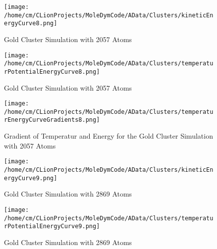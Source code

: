 \begin{figure}[!h] 
    \begin{center} 
        \texttt{[image: /home/cm/CLionProjects/MoleDymCode/AData/Clusters/kineticEnergyCurve8.png]} 
    \end{center} 
    \caption[Gold Cluster Simulation with 2057 Atoms]{Gold Cluster Simulation with 2057 Atoms} 
    \label{GoldClusterSimulationKineticTime2057} 
\end{figure} 
 
\begin{figure}[!h] 
    \begin{center} 
        \texttt{[image: /home/cm/CLionProjects/MoleDymCode/AData/Clusters/temperaturPotentialEnergyCurve8.png]} 
    \end{center} 
    \caption[Gold Cluster Simulation with 2057 Atoms]{Gold Cluster Simulation with 2057 Atoms} 
    \label{GoldClusterSimulationTemperaturEnergy2057} 
\end{figure} 
 
\begin{figure}[!h] 
    \begin{center} 
        \texttt{[image: /home/cm/CLionProjects/MoleDymCode/AData/Clusters/temperaturEnergyCurveGradients8.png]} 
    \end{center} 
    \caption[Gradient of Temperatur and Energy for the Gold Cluster Simulation with 2057 Atoms]{Gradient of Temperatur and Energy for the Gold Cluster Simulation with 2057 Atoms} 
    \label{GoldClusterSimulationGradient2057} 
\end{figure} 
 
\begin{figure}[!h] 
    \begin{center} 
        \texttt{[image: /home/cm/CLionProjects/MoleDymCode/AData/Clusters/kineticEnergyCurve9.png]} 
    \end{center} 
    \caption[Gold Cluster Simulation with 2869 Atoms]{Gold Cluster Simulation with 2869 Atoms} 
    \label{GoldClusterSimulationKineticTime2869} 
\end{figure} 
 
\begin{figure}[!h] 
    \begin{center} 
        \texttt{[image: /home/cm/CLionProjects/MoleDymCode/AData/Clusters/temperaturPotentialEnergyCurve9.png]} 
    \end{center} 
    \caption[Gold Cluster Simulation with 2869 Atoms]{Gold Cluster Simulation with 2869 Atoms} 
    \label{GoldClusterSimulationTemperaturEnergy2869} 
\end{figure} 
 
